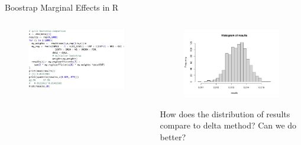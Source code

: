 \begin{frame}{Boostrap Marginal Effects in R}
\begin{columns}
\begin{column}{0.5\textwidth}
\begin{figure}
\flushleft
	\includegraphics [width=\textwidth]	{boot_code}
\end{figure}
\end{column}
\begin{column}{0.5\textwidth}
\begin{figure}
\flushleft
	\includegraphics [width=\textwidth]	{boot_plot}\\
\end{figure}
How does the distribution of results compare to delta method? Can we do better?
\end{column}
\end{columns}
\end{frame}



